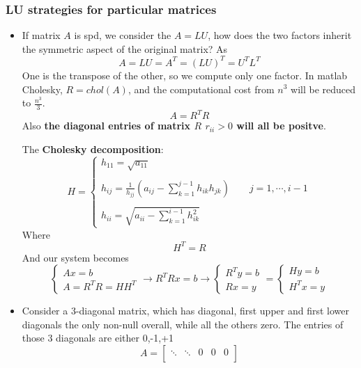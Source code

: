 \subsubsection{LU strategies for particular matrices}
    \begin{itemize}
        \item If matrix $A$ is spd, we consider the $A=LU$, how does the two factors inherit the symmetric aspect of the original matrix? As
        $$A=LU=A^T=(LU)^T=U^TL^T$$
        One is the transpose of the other, so we compute only one factor. In matlab Cholesky, $R=chol(A)$, and the computational cost from $n^3$ will be reduced to $\frac{n^3}{3}$.
        $$
        A=R^TR
        $$
        Also \textbf{the diagonal entries of matrix $R$ $r_{ii}>0$ will all be positve}.

        The \textbf{Cholesky decomposition}:
        $$
        H=
        \begin{cases}
            h_{11}=\sqrt{a_{11}}\\
            \\
            h_{ij}=\frac{1}{h_{jj}}\left(
                a_{ij}-\sum_{k=1}^{j-1}h_{ik}h_{jk}
            \right)\qquad j=1,\cdots,i-1\\
            \\
            h_{ii}=\sqrt{
                a_{ii}-\sum_{k=1}^{i-1}h_{ik}^2
            }
        \end{cases}
        $$
        Where
        $$H^T=R$$
        And our system becomes
        $$
        \begin{cases}
            Ax =b\\
            A=R^TR=HH^T
        \end{cases}
        \rightarrow
        R^TRx=b
        \rightarrow
        \begin{cases}
            R^Ty=b\\
            Rx=y
        \end{cases}
        =
        \begin{cases}
            Hy=b\\
            H^Tx=y
        \end{cases}
        $$
        \item Consider a 3-diagonal matrix, which has diagonal, first upper and first lower diagonals the only non-null overall, while all the others zero. The entries of those 3 diagonals are either 0,-1,+1
        $$
        A=\begin{bmatrix}
            \ddots & \ddots & 0 & 0 & 0\\

\end{bmatrix}$$
\end{itemize}
